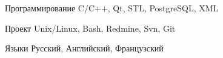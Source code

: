 

\begin{cvskills}

  \cvskill
    {Программирование} %
    {C/C++, Qt, STL, PostgreSQL, XML} %

  \cvskill
    {\faCodeFork\acvHeaderIconSep\acvHeaderIconSep Проект} %
    {Unix/Linux, Bash, Redmine, Svn, Git} %

  \cvskill
    {\faLanguage\acvHeaderIconSep\acvHeaderIconSep Языки} %
    {Русский, Английский, Французский} %

\end{cvskills}
